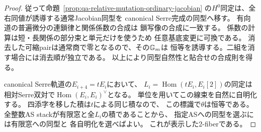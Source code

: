 \begin{proof}
従って命題~\ref{prop:qa-relative-mutation-ordinary-jacobian}
の$H^0$同定は、全右同値が誘導する通常Jacobian同型を
canonical Serre完成の同型へ移す。
有向道の普遍微分の連鎖律と関係係数の合成は
鎖写像の合成に一致する。
係数の計算は短・長関係の部分束と単元だけを使うため
任意基底変更に可換である。
消去した可縮pairは通常商で零となるので、その$\mathbb G_m$は
恒等を誘導する。二組を消す場合には消去順が独立である。
以上により同型自然性と貼合せの合成則を得る。

canonical Serre軌道の$E_{i+4}=tE_i$において、
$L_i=\operatorname{Hom}(tE_i,E_i[2])$の同定は
相対Serre双対で$\operatorname{Hom}(E_i,E_i)^\vee$となる。
単位を用いてこの線束を自然に自明化する。
四添字を移した積は$t$による同じ積なので、
この標識で$\theta$は恒等である。
全整数AS stackが有限窓と全$L_i$の積であることから、
指定ASへの同型を選ぶには有限窓への同型と
各自明化を選べばよい。
これが表示した2-fiberである。
\end{proof}

